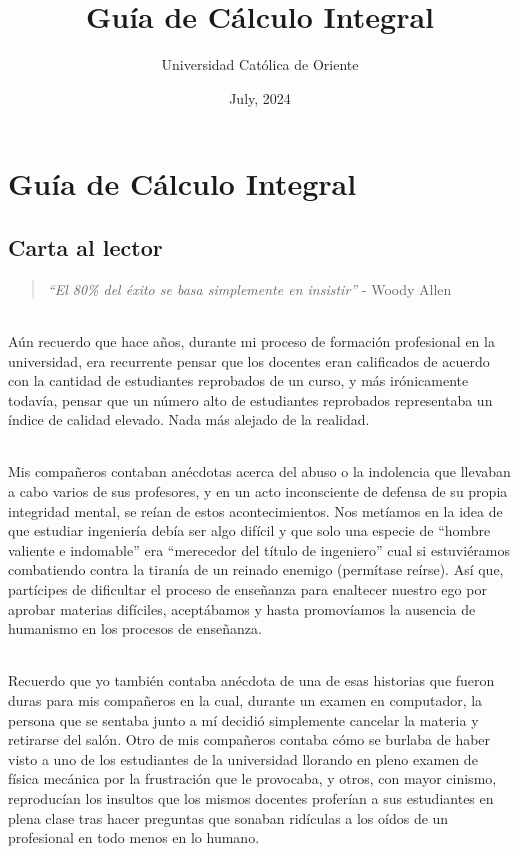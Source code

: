 \documentclass{book}
\title{Guía de Cálculo Integral}
\author{Universidad Católica de Oriente}
\date{July, 2024}
\begin{document}
    \part{Guía de Cálculo Integral}
    \chapter{Carta al lector}
        \begin{quote}
        \textit{``El 80\% del éxito se basa simplemente en insistir''} - Woody Allen
        \end{quote}
        \paragraph{}Aún recuerdo que hace años, durante mi proceso de formación profesional en la universidad, era recurrente pensar que los docentes eran calificados de acuerdo con la cantidad de estudiantes reprobados de un curso, y más irónicamente todavía, pensar que un número alto de estudiantes reprobados representaba un índice de calidad elevado. Nada más alejado de la realidad.
        \paragraph{}Mis compañeros contaban anécdotas acerca del abuso o la indolencia que llevaban a cabo varios de sus profesores, y en un acto inconsciente de defensa de su propia integridad mental, se reían de estos acontecimientos. Nos metíamos en la idea de que estudiar ingeniería debía ser algo difícil y que solo una especie de ``hombre valiente e indomable'' era ``merecedor del título de ingeniero'' cual si estuviéramos combatiendo contra la tiranía de un reinado enemigo (permítase reírse). Así que, partícipes de dificultar el proceso de enseñanza para enaltecer nuestro ego por aprobar materias difíciles, aceptábamos y hasta promovíamos la ausencia de humanismo en los procesos de enseñanza.
        \paragraph{}Recuerdo que yo también contaba anécdota de una de esas historias que fueron duras para mis compañeros en la cual, durante un examen en computador, la persona que se sentaba junto a mí decidió simplemente cancelar la materia y retirarse del salón. Otro de mis compañeros contaba cómo se burlaba de haber visto a uno de los estudiantes de la universidad llorando en pleno examen de física mecánica por la frustración que le provocaba, y otros, con mayor cinismo, reproducían los insultos que los mismos docentes proferían a sus estudiantes en plena clase tras hacer preguntas que sonaban ridículas a los oídos de un profesional en todo menos en lo humano.
\end{document}
